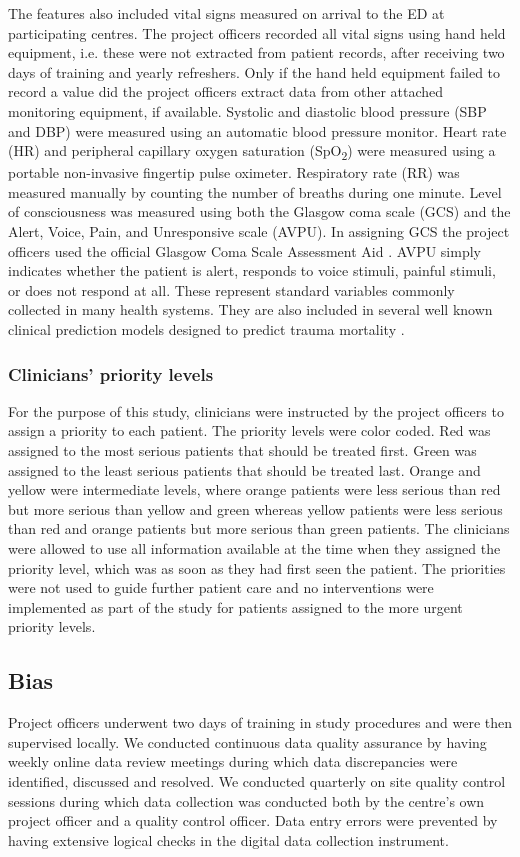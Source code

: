 \documentclass[10pt,letterpaper]{article}\usepackage[]{graphicx}\usepackage[]{color}
\begin{document}
The features also included vital signs measured on arrival to the ED at
participating centres. The project officers recorded all vital signs using hand
held equipment, i.e. these were not extracted from patient records, after
receiving two days of training and yearly refreshers. Only if the hand held
equipment failed to record a value did the project officers extract data from
other attached monitoring equipment, if available. Systolic and diastolic blood
pressure (SBP and DBP) were measured using an automatic blood pressure
monitor. Heart rate (HR) and peripheral capillary oxygen saturation
(SpO\textsubscript{2}) were measured using a portable non-invasive fingertip
pulse oximeter. Respiratory rate (RR) was measured manually by counting the
number of breaths during one minute. Level of consciousness was measured using
both the Glasgow coma scale (GCS) and the Alert, Voice, Pain, and Unresponsive
scale (AVPU). In assigning GCS the project officers used the official Glasgow
Coma Scale Assessment Aid \cite{GCSAID}. AVPU simply indicates whether the
patient is alert, responds to voice stimuli, painful stimuli, or does not
respond at all. These represent standard variables commonly collected in many
health systems. They are also included in several well known clinical prediction
models designed to predict trauma mortality \cite{Rehn2011}.

\subsubsection*{Clinicians' priority levels}
For the purpose of this study, clinicians were instructed by the project
officers to assign a priority to each patient. The priority levels were color
coded. Red was assigned to the most serious patients that should be treated
first. Green was assigned to the least serious patients that should be treated
last. Orange and yellow were intermediate levels, where orange patients were
less serious than red but more serious than yellow and green whereas yellow
patients were less serious than red and orange patients but more serious than
green patients. The clinicians were allowed to use all information available at
the time when they assigned the priority level, which was as soon as they had first
seen the patient. The priorities were not used to guide further patient care and
no interventions were implemented as part of the study for patients assigned to
the more urgent priority levels.

\subsection*{Bias}
Project officers underwent two days of training in study procedures and were
then supervised locally. We conducted continuous data quality assurance by having
weekly online data review meetings during which data discrepancies were
identified, discussed and resolved. We conducted quarterly on site quality
control sessions during which data collection was conducted both by the centre's
own project officer and a quality control officer. Data entry errors were
prevented by having extensive logical checks in the digital data collection
instrument.
\end{document}
